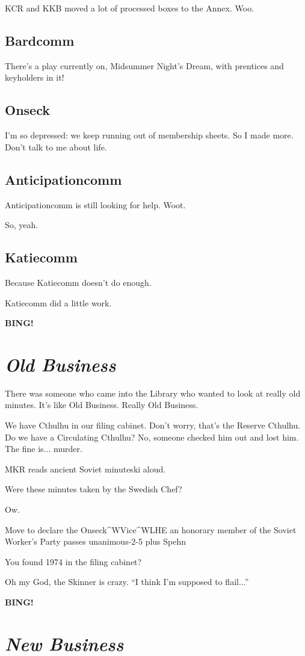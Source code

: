 \documentclass[10pt]{article}
\newcommand{\bing}{{\bf BING!} }
\newcommand{\goto}[1]{\bing \vskip 12pt \section*{{\em{#1}}}}
\newcommand{\ps}{ plus Spehn\xspace}
\begin{document}
KCR and KKB moved a lot of processed boxes to the Annex.  Woo.

\subsection*{Bardcomm}

There's a play currently on, Midsummer Night's Dream, with prentices
and keyholders in it!

\subsection*{Onseck}

I'm so depressed: we keep running out of membership sheets.  So I made
more.  Don't talk to me about life.

\subsection*{Anticipationcomm}

Anticipationcomm is still looking for help.  Woot.

So, yeah.

\subsection*{Katiecomm}

Because Katiecomm doesn't do enough.

Katiecomm did a little work. 

\goto{Old Business}

There was someone who came into the Library who wanted to look at
really old minutes.  It's like Old Business.  Really Old Business.

We have Cthulhu in our filing cabinet.  Don't worry, that's the
Reserve Cthulhu.  Do we have a Circulating Cthulhu?  No, someone
checked him out and lost him.  The fine is... murder.

MKR reads ancient Soviet minuteski aloud.

Were these minutes taken by the Swedish Chef?

Ow.

Move to declare the Onseck^WVice^WLHE an honorary member of the Soviet
Worker's Party passes unanimous-2-5\ps

You found 1974 in the filing cabinet?

Oh my God, the Skinner is crazy.  ``I think I'm supposed to flail...'' 

\goto{New Business}
\end{document}
